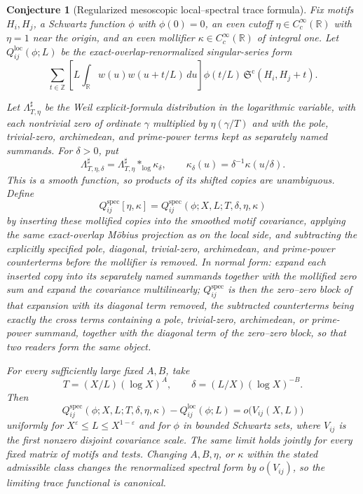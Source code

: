 \documentclass[11pt]{article}
\newtheorem{conjecture}{Conjecture}
\theoremstyle{definition}
\newcommand{\SG}{\mathfrak S}
\newcommand{\Z}{\mathbb Z}
\newcommand{\R}{\mathbb R}
\newcommand{\eps}{\varepsilon}
\providecommand{\Z}{\mathbb Z}
\providecommand{\R}{\mathbb R}
\begin{document}
\begin{conjecture}[Regularized mesoscopic local--spectral trace formula]\label{s3}
Fix motifs $H_i,H_j$, a Schwartz function $\phi$ with $\phi(0)=0$, an even cutoff
$\eta\in C_c^\infty(\R)$ with $\eta=1$ near the origin, and an even mollifier
$\kappa\in C_c^\infty(\R)$ of integral one.  Let
$Q^{\mathrm{loc}}_{ij}(\phi;L)$ be the exact-overlap-renormalized singular-series form
\[
 \sum_{t\in\Z}
 \left[L\int_{\R}w(u)w(u+t/L)\,du\right]
 \phi(t/L)\,\SG^{\mathrm c}(H_i,H_j+t).
\]

Let $\Lambda_{T,\eta}^{\sharp}$ be the Weil explicit-formula distribution in the
logarithmic variable, with each nontrivial zero of ordinate $\gamma$ multiplied by
$\eta(\gamma/T)$ and with the pole, trivial-zero, archimedean, and prime-power terms
kept as separately named summands.  For $\delta>0$, put
\[
 \Lambda_{T,\eta,\delta}^{\sharp}
   =\Lambda_{T,\eta}^{\sharp}*_{\log}\kappa_\delta,
 \qquad \kappa_\delta(u)=\delta^{-1}\kappa(u/\delta).
\]
This is a smooth function, so products of its shifted copies are unambiguous.  Define
\[
 Q^{\mathrm{spec}}_{ij}[\eta,\kappa]
 =Q^{\mathrm{spec}}_{ij}(\phi;X,L;T,\delta,\eta,\kappa)
\]
by inserting these mollified copies into the smoothed motif covariance, applying the
same exact-overlap M\"obius
projection as on the local side, and subtracting the explicitly specified pole,
diagonal, trivial-zero, archimedean, and prime-power counterterms before the mollifier
is removed.  In normal form: expand each inserted copy into its
separately named summands together with the mollified zero sum and
expand the covariance multilinearly; $Q^{\mathrm{spec}}_{ij}$ is then
the zero--zero block of that expansion with its diagonal term removed,
the subtracted counterterms being exactly the cross terms containing a
pole, trivial-zero, archimedean, or prime-power summand, together with
the diagonal term of the zero--zero block, so that two readers form
the same object.

For every sufficiently large fixed $A,B$, take
\[
 T=(X/L)(\log X)^A,
 \qquad
 \delta=(L/X)(\log X)^{-B}.
\]
Then
\[
 Q^{\mathrm{spec}}_{ij}(\phi;X,L;T,\delta,\eta,\kappa)
 -Q^{\mathrm{loc}}_{ij}(\phi;L)
 =o\bigl(V_{ij}(X,L)\bigr)
\]
uniformly for $X^\eps\le L\le X^{1-\eps}$ and for $\phi$ in bounded Schwartz sets,
where $V_{ij}$ is the first nonzero disjoint covariance scale.  The same limit holds
jointly for every fixed matrix of motifs and tests.  Changing $A,B,\eta$, or $\kappa$
within the stated admissible class changes the renormalized spectral form by
$o(V_{ij})$, so the limiting trace functional is canonical.
\end{conjecture}
\end{document}
